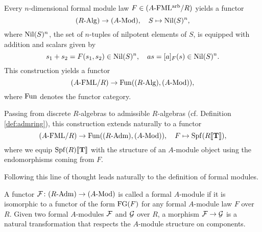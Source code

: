 \documentclass[../main.tex]{subfiles}
\begin{document}
Every $n$-dimensional formal module law $F \in {({A}\textnormal-\allowbreak\mathrm{FML^{arb}}/{R})}$
yields a functor
\begin{equation}\label{eq:fmnilpfunc}
  {({R}\textnormal-\allowbreak\mathrm{Alg})} \to {({A}\textnormal-\allowbreak\mathrm{Mod})}, \quad S \mapsto {\operatorname{Nil}}(S)^n,
\end{equation}
where ${\operatorname{Nil}}(S)^n$, the set of $n$-tuples of nilpotent elements of $S$, is
equipped with addition and scalars given by 
\begin{equation*}
  s_1 + s_2 = F(s_1, s_2) \in {\operatorname{Nil}}(S)^n, \quad a s = [a]_F(s) \in {\operatorname{Nil}}(S)^n.
\end{equation*}
This construction yields a functor 
\begin{equation}\label{eq:formfunc}
  {({A}\textnormal-\allowbreak\mathrm{FML}/{R})} \to \operatorname{Fun}({({R}\textnormal-\allowbreak\mathrm{Alg})}, {({A}\textnormal-\allowbreak\mathrm{Mod})}),
\end{equation}
where $\operatorname{Fun}$ denotes the functor category.

Passing from discrete $R$-algebras to admissible $R$-algebras (cf. Definition
\ref{def:admring}), this construction extends naturally to a functor 
\begin{equation*}
  {({A}\textnormal-\allowbreak\mathrm{FML}/{R})} \to \operatorname{Fun} ({({R}\textnormal-\allowbreak\mathrm{Adm})}, {({A}\textnormal-\allowbreak\mathrm{Mod})}), \quad F \mapsto \operatorname{Spf} (R\llbracket \mathbf{T} \rrbracket),
\end{equation*}
where we equip $\operatorname{Spf}(R) \llbracket \mathbf{T} \rrbracket$ with the structure of an $A$-module object
using the endomorphisms coming from $F$. 

Following this line of thought leads naturally to the definition of
formal modules. 

\begin{defi}
  A functor $\mathcal{F} \colon {({R}\textnormal-\allowbreak\mathrm{Adm})} \to {({A}\textnormal-\allowbreak\mathrm{Mod})}$ is called a formal $A$-module if it
  is isomorphic to a functor of the form $\textnormal{FG}(F)$ for
  any formal $A$-module law $F$ over $R$. Given two formal $A$-modules $\mathcal{F}$
  and $\mathcal{G}$ over $R$, a
  morphism $\mathcal{F} \to \mathcal{G}$ is a natural transformation that respects the 
  $A$-module structure on components.
\end{defi}

\end{document}
